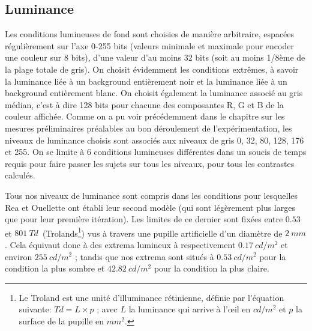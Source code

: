 	\subsection{Luminance}
	\par Les conditions lumineuses de fond sont choisies de manière arbitraire, espacées régulièrement sur l'axe 0-255 bits (valeurs minimale et maximale pour encoder une couleur sur 8 bits), d'une valeur d'au moins 32 bits (soit au moins 1/8ème de la plage totale de gris). On choisit évidemment les conditions extrêmes, à savoir la luminance liée à un background entièrement noir et la luminance liée à un background entièrement blanc. On choisit également la luminance associé au gris médian, c'est à dire 128 bits pour chacune des composantes R, G et B de la couleur affichée. Comme on a pu voir précédemment dans le chapitre sur les mesures préliminaires préalables au bon déroulement de l'expérimentation, les niveaux de luminance choisis sont associés aux niveaux de gris 0, 32, 80, 128, 176 et 255. On se limite à 6 conditions lumineuses différentes dans un soucis de temps requis pour faire passer les sujets sur tous les niveaux, pour tous les contrastes calculés.

	\par Tous nos niveaux de luminance sont compris dans les conditions pour lesquelles Rea et Ouellette ont établi leur second modèle (qui sont légèrement plus larges que pour leur première itération). Les limites de ce dernier sont fixées entre $0.53$ et $801~Td$~(Trolands\footnote{Le Troland est une unité d'illuminance rétinienne, définie par l'équation suivante: $Td = L \times p$ ; avec $L$ la luminance qui arrive à l'œil en $cd/m^2$ et $p$ la surface de la pupille en $mm^2$.}) vus à travers une pupille artificielle d'un diamètre de $2~mm$. Cela équivaut donc à des extrema lumineux à respectivement $0.17~cd/m^2$ et environ $255~cd/m^2$ ; tandis que nos extrema sont situés à $0.53~cd/m^2$ pour la condition la plus sombre et $42.82~cd/m^2$ pour la condition la plus claire.
	
